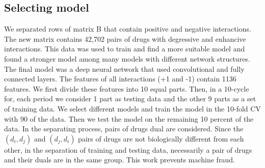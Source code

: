 \documentclass{bmcart}
\begin{document}
\subsection*{Selecting model\label{Selecting model}}
We separated rows of matrix B that contain positive and negative interactions. The new matrix contains 42,702 pairs of drugs with degressive and enhancive interactions. This data was used to train and find a more suitable model and found a stronger model among many models with different network structures. The final model was a deep neural network that used convolutional and fully connected layers. The features of all interactions (+1 and -1) contain 1136 features. We first divide these features into 10 equal parts. Then, in a 10-cycle for, each period we consider 1 part as testing data and the other 9 parts as a set of training data. We select different models and train the model in the 10-fold CV with 90  of the data. Then we test the model on the remaining 10 percent of the data. In the separating process, pairs of drugs dual are considered. Since the $ (d_i, d_j) $ and $ (d_j, d_i) $ pairs of drugs are not biologically different from each other, in the separation of training and testing data, necessarily a pair of drugs and their duals are in the same group. This work prevents machine fraud.
\end{document}
